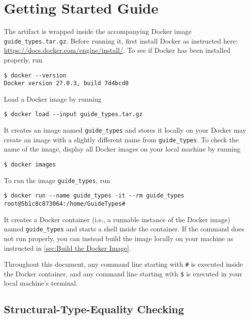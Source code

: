 
\section{Getting Started Guide}

The artifact is wrapped inside the accompanying Docker image
\texttt{guide\_types.tar.gz}.
%
Before running it, first install Docker as instructed here:
\url{https://docs.docker.com/engine/install/}.
%
To see if Docker has been installed properly, run
\begin{verbatim}
$ docker --version
Docker version 27.0.3, build 7d4bcd8
\end{verbatim}

Load a Docker image by running
\begin{verbatim}
$ docker load --input guide_types.tar.gz
\end{verbatim}
%
It creates an image named \texttt{guide\_types} and stores it locally on your
%
Docker may create an image with a slightly different name from
\texttt{guide\_types}.
%
To check the name of the image, display all Docker images on your local machine
by running
\begin{verbatim}
$ docker images
\end{verbatim}

To run the image \texttt{guide\_types}, run
\begin{verbatim}
$ docker run --name guide_types -it --rm guide_types
root@5b1c8c873064:/home/GuideTypes#
\end{verbatim}
%
It creates a Docker container (i.e., a runnable instance of the Docker image)
named \texttt{guide\_types} and starts a shell inside the container.
%
If the command does not run properly, you can instead build the image locally on
your machine as instructed in \cref{sec:Build the Docker Image}.

Throughout this document, any command line starting with \texttt{\#} is executed
inside the Docker container, and any command line starting with \texttt{\$} is
executed in your local machine's terminal.

\subsection{Structural-Type-Equality Checking}

